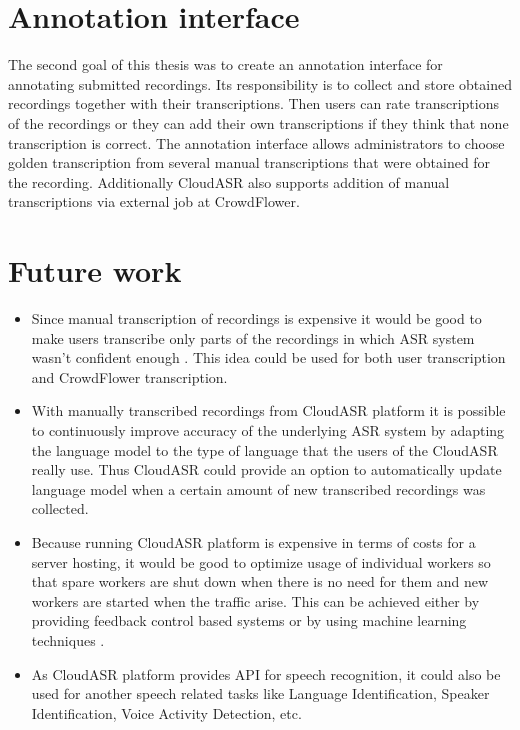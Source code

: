 \section*{Annotation interface}
The second goal of this thesis was to create an annotation interface for annotating submitted recordings.
Its responsibility is to collect and store obtained recordings together with their transcriptions.
Then users can rate transcriptions of the recordings
  or they can add their own transcriptions
  if they think that none transcription is correct.
The annotation interface allows administrators to choose golden transcription from several manual transcriptions
  that were obtained for the recording.
Additionally CloudASR also supports addition of manual transcriptions via external job at CrowdFlower.


\section*{Future work}
\begin{itemize}
  \item
    Since manual transcription of recordings is expensive
      it would be good to make users transcribe only parts of the recordings
      in which ASR system wasn't confident enough \cite{sperber2014fly}.
    This idea could be used for both user transcription and CrowdFlower transcription.

  \item
    With manually transcribed recordings from CloudASR platform
      it is possible to continuously improve accuracy of the underlying ASR system
      by adapting the language model to the type of language that the users of the CloudASR really use.
    Thus CloudASR could provide an option to automatically update language model
      when a certain amount of new transcribed recordings was collected.

  \item
    Because running CloudASR platform is expensive in terms of costs for a server hosting,
      it would be good to optimize usage of individual workers
      so that spare workers are shut down when there is no need for them
      and new workers are started when the traffic arise.
    This can be achieved either by providing feedback control based systems \cite{janert2013feedback}
      or by using machine learning techniques \cite{gong2010press}.

  \item
    As CloudASR platform provides API for speech recognition,
      it could also be used for another speech related tasks like Language Identification, Speaker Identification, Voice Activity Detection, etc.

\end{itemize}


